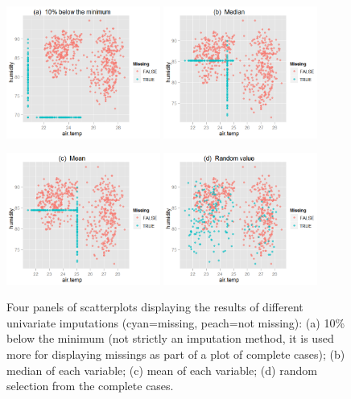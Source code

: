 \documentclass[article]{jss}
\begin{document}
\begin{center}
\begin{figure}[h]
\begin{centering}
\includegraphics[width=0.45\textwidth]{fig3-1} 
\includegraphics[width=0.45\textwidth]{fig3-2}
\par\end{centering}

\begin{centering}
\includegraphics[width=0.45\textwidth]{fig3-3} 
\includegraphics[width=0.45\textwidth]{fig3-4}
\par\end{centering}

\caption{Four panels of scatterplots displaying the results of different univariate imputations (cyan=missing, peach=not missing): (a) 10\% below the minimum (not strictly an imputation method, it is used more for displaying missings as part of a plot of complete cases); (b) median of each variable; (c) mean of each variable; (d) random selection from the complete cases. }
\end{figure}
\label{fig:univariate-imputation}
\par\end{center}
\end{document}
